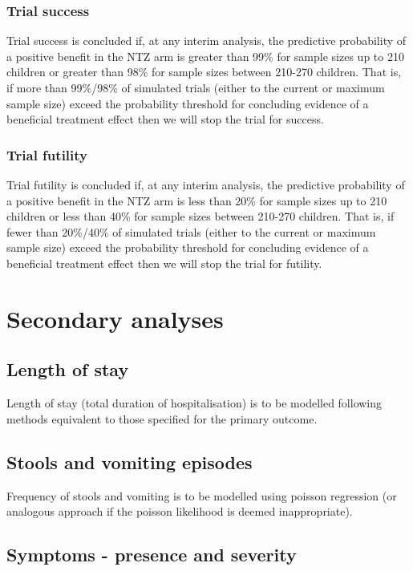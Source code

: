 \documentclass[a4paper]{article}
\begin{document}
\subsubsection{Trial success}

Trial success is concluded if, at any interim analysis, the predictive probability of a positive benefit in the NTZ arm is greater than 99\% for sample sizes up to 210 children or greater than 98\% for sample sizes between 210-270 children.
That is, if more than 99\%/98\% of simulated trials (either to the current or maximum sample size) exceed the probability threshold for concluding evidence of a beneficial treatment effect then we will stop the trial for success.

\subsubsection{Trial futility}

Trial futility is concluded if, at any interim analysis, the predictive probability of a positive benefit in the NTZ arm is less than 20\% for sample sizes up to 210 children or less than 40\% for sample sizes between 210-270 children.
That is, if fewer than 20\%/40\% of simulated trials (either to the current or maximum sample size) exceed the probability threshold for concluding evidence of a beneficial treatment effect then we will stop the trial for futility.

\section{Secondary analyses}

\subsection{Length of stay}

Length of stay (total duration of hospitalisation) is to be modelled following methods equivalent to those specified for the primary outcome. 

\subsection{Stools and vomiting episodes}

Frequency of stools and vomiting is to be modelled using poisson regression (or analogous approach if the poisson likelihood is deemed inappropriate).

\subsection{Symptoms - presence and severity}
\end{document}
